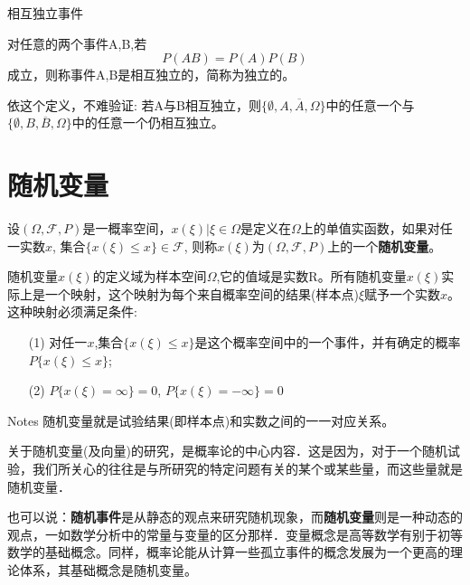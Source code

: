 \documentclass[xcolor=svgnames,serif,table,10pt]{beamer}
\begin{document}
\begin{frame}{相互独立事件}
\begin{definition}
对任意的两个事件A,B,若
\[P(AB)=P(A)P(B)\]
成立，则称事件A,B是相互独立的，简称为独立的。	
\end{definition}
\begin{block}{依这个定义，不难验证:}
	若A与B相互独立，则$\{\emptyset,A,\overline{A},\Omega\}$中的任意一个与$\{\emptyset,B,\overline{B},\Omega\}$中的任意一个仍相互独立。
\end{block}
\end{frame}

\section{随机变量}

\begin{frame}
\begin{definition}
	设$(\Omega,\mathcal{F},P)$是一概率空间，$x(\xi)|\xi\in\Omega$是定义在$\Omega$上的单值实函数，如果对任一实数$x$, 集合$\{x(\xi)\le x\}\in\mathcal{F}$, 则称$x(\xi)$为$(\Omega,\mathcal{F},P)$上的一个\textbf{随机变量}。
	
	随机变量$x(\xi)$的定义域为样本空间$\Omega$,它的值域是实数R。所有随机变量$x(\xi)$实际上是一个映射，这个映射为每个来自概率空间的结果(样本点)$\xi$赋予一个实数$x$。这种映射必须满足条件:
	\begin{itemize}
		\item[(1)] 对任一$x$,集合$\{x(\xi)\le x\}$是这个概率空间中的一个事件，并有确定的概率$P\{x(\xi)\le x\}$;
		\item[(2)] $P\{x(\xi)=\infty \}=0$, $P\{x(\xi)=-\infty \}=0$
	\end{itemize}
	\begin{block}{Notes}
		随机变量就是试验结果(即样本点)和实数之间的一一对应关系。
	\end{block}
\end{definition}
\end{frame}

\begin{frame}
关于随机变量(及向量)的研究，是概率论的中心内容．这是因为，对于一个随机试验，我们所关心的往往是与所研究的特定问题有关的某个或某些量，而这些量就是随机变量．

也可以说：\textbf{随机事件}是从静态的观点来研究随机现象，而\textbf{随机变量}则是一种动态的观点，一如数学分析中的常量与变量的区分那样．变量概念是高等数学有别于初等数学的基础概念。同样，概率论能从计算一些孤立事件的概念发展为一个更高的理论体系，其基础概念是随机变量。
\end{frame}
\end{document}
